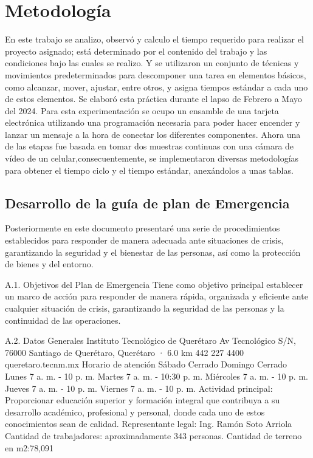     \section{Metodología}
    
    En este trabajo se analizo, observó y calculo el tiempo requerido para realizar el proyecto asignado; está determinado por el contenido del trabajo y las condiciones bajo las cuales se realizo. Y se utilizaron un conjunto de técnicas y movimientos predeterminados para descomponer una tarea en elementos básicos, como alcanzar, mover, ajustar, entre otros, y asigna tiempos estándar a cada uno de estos elementos.
    Se elaboró esta práctica durante el lapso de Febrero a Mayo del 2024.
    Para esta experimentación se ocupo un ensamble de una tarjeta electrónica utilizando una programación necesaria para poder hacer encender y lanzar un mensaje a la hora de conectar los diferentes componentes.
    Ahora una de las etapas fue basada en tomar dos muestras continuas con una cámara de vídeo de un celular,consecuentemente, se implementaron diversas metodologías para obtener el tiempo ciclo y el tiempo estándar, anexándolos a unas tablas.
    \subsection{Desarrollo de la guía de plan de Emergencia}
    Posteriormente en este documento presentaré una serie de procedimientos establecidos para responder de manera adecuada ante situaciones de crisis, garantizando la seguridad y el bienestar de las personas, así como la protección de bienes y del entorno. 
    
    
    A.1. Objetivos del Plan de Emergencia
    Tiene como objetivo principal establecer un marco de acción para responder de manera rápida, organizada y eficiente ante cualquier situación de crisis, garantizando la seguridad de las personas y la continuidad de las operaciones.
    
    A.2. Datos Generales
    Instituto Tecnológico de Querétaro
    Av Tecnológico S/N, 76000 Santiago de Querétaro, Querétaro · 6.0 km
    442 227 4400
    queretaro.tecnm.mx
    Horario de atención
    Sábado Cerrado
    Domingo Cerrado
    Lunes 7 a. m. - 10 p. m.
    Martes 7 a. m. - 10:30 p. m.
    Miércoles 7 a. m. - 10 p. m.
    Jueves 7 a. m. - 10 p. m.
    Viernes 7 a. m. - 10 p. m.
    Actividad principal: Proporcionar educación superior y formación integral que contribuya a su
    desarrollo académico, profesional y personal, donde cada uno de estos conocimientos sean de
    calidad.
    Representante legal: Ing. Ramón Soto Arriola
    Cantidad de trabajadores: aproximadamente 343 personas.
    Cantidad de terreno en m2:78,091
    
